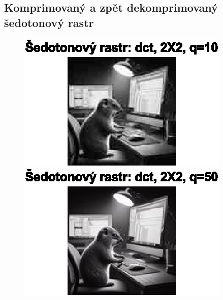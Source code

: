 
\subsection{Komprimovaný a zpět dekomprimovaný šedotonový rastr}
\begin{figure}[H]
    \centering
    \begin{minipage}[b]{0.3\textwidth}
        \centering
        \includegraphics[width=\textwidth]{images/sedo_dct_2X2_q10.eps}
    \end{minipage}
    \hfill
    \begin{minipage}[b]{0.3\textwidth}
        \centering
        \includegraphics[width=\textwidth]{images/sedo_dct_2X2_q50.eps}
    \end{minipage}
    \hfill
    \begin{minipage}[b]{0.3\textwidth}
        \centering

\end{minipage}
\end{figure}

